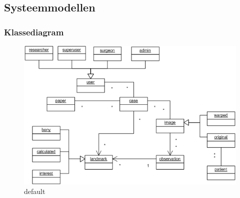 \subsection{Systeemmodellen}
\subsubsection{Klassediagram}
\begin{figure}[htbp]
\begin{center}
	\includegraphics[scale=0.8]{brainstorm_klassediagram}
\caption{default}
\label{default}
\end{center}
\end{figure}
